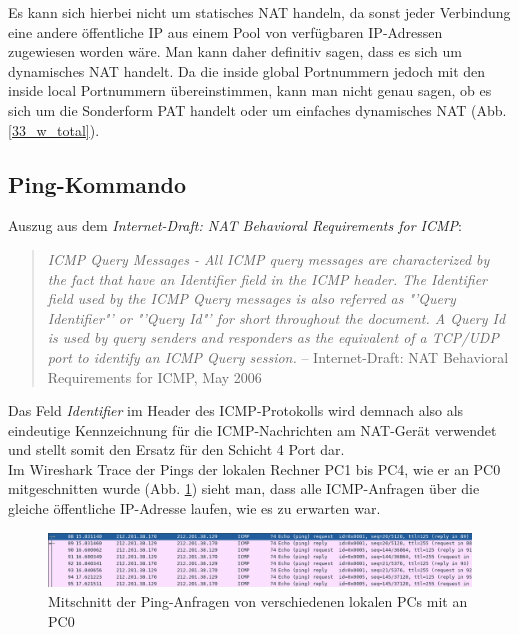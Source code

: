 \documentclass[11pt, a4paper]{article}
\begin{document}
Es kann sich hierbei nicht um statisches NAT handeln, da sonst jeder Verbindung
eine andere öffentliche IP aus einem Pool von verfügbaren IP-Adressen zugewiesen
worden wäre. Man kann daher definitiv sagen, dass es sich um dynamisches NAT
handelt. Da die inside global Portnummern jedoch mit den inside local Portnummern
übereinstimmen, kann man nicht genau sagen, ob es sich um die Sonderform PAT
handelt oder um einfaches dynamisches NAT (Abb. \ref{33_w_total}).


\subsection{Ping-Kommando}

Auszug aus dem \emph{Internet-Draft: NAT Behavioral Requirements for ICMP}:
\begin{quote}
  \textit{ICMP Query Messages - All ICMP query messages are characterized
   by the fact that have an Identifier field in the ICMP header. The
   Identifier field used by the ICMP Query messages is also referred
   as "'Query Identifier"' or "'Query Id"' for short throughout the
   document. A Query Id is used by query senders and responders as
   the equivalent of a TCP/UDP port to identify an ICMP Query session.}
 -- Internet-Draft: NAT Behavioral Requirements for ICMP, May 2006
\end{quote}

Das Feld \emph{Identifier} im Header des ICMP-Protokolls wird demnach also als
eindeutige Kennzeichnung für die ICMP-Nachrichten am NAT-Gerät verwendet und
stellt somit den Ersatz für den Schicht 4 Port dar.\\

Im Wireshark Trace der Pings der lokalen Rechner PC1 bis PC4, wie er an PC0
mitgeschnitten wurde (Abb. \ref{ws_total}) sieht man, dass alle ICMP-Anfragen
über die gleiche öffentliche IP-Adresse laufen, wie es zu erwarten war.\\

\begin{figure}[H]
  \centering
  \includegraphics[width=\textwidth]
  {graphics/bilder/zusatz/ws_total}
  \caption{Mitschnitt der Ping-Anfragen von verschiedenen lokalen PCs mit an PC0
  }\label{ws_total}
\end{figure}
\end{document}

